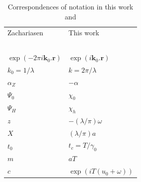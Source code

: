 \documentclass{iucr}
\begin{document}
\begin{table}
\caption{Correspondences of notation in this work and \cite{ZachariasenBook}}
    \begin{center}
\begin{tabular}{ll}      %
 Zachariasen    & This work     \\
 ~~~\\
$\exp(-2\pi i \textbf{k}_0.\textbf{r})$ & $\exp(i\textbf{k}_0.\textbf{r})$      \\
 $k_0=1/\lambda$ & $k=2 \pi / \lambda$      \\
 $\alpha_Z$      & $-\alpha$                \\
 $\Psi_0$      & $\chi_0$                 \\
 $\Psi_H$      & $\chi_h$                 \\
 $z$           & $-(\lambda/\pi) \omega$  \\
 $X$           & $(\lambda/\pi) a$        \\
 $t_0$         & $t_c=T/\gamma_0$         \\
 $m$           & $a T$                    \\
 $c$  & $\exp(i T (u_0+\omega))$   
 \end{tabular}
     \end{center}
\end{table}






\end{document}
